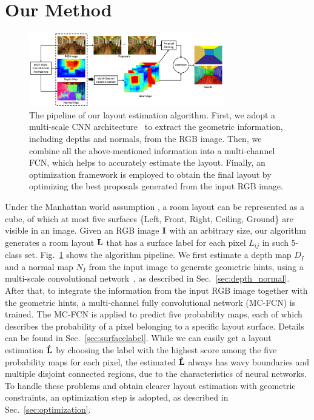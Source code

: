 \section{Our Method}
\label{sec:Meth}

 

\begin{figure}[!ht]
	\centering
	\includegraphics[width=8.5cm]{figure/ppline.png}
	\caption{The pipeline of our layout estimation algorithm. First, we adopt a multi-scale CNN architecture~\cite{eigen2015predicting} to extract the geometric information, including depths and normals, from the RGB image. Then, we combine all the above-mentioned information into a multi-channel FCN, which helps to accurately estimate the layout. Finally, an optimization framework is employed to obtain the final layout by optimizing the best proposals generated from the input RGB image.}
	\label{fig:pipeline}
\end{figure}

Under the Manhattan world assumption \cite{coughlan1999manhattan}, a room layout can be represented as a cube, of which at most five surfaces \{Left, Front, Right, Ceiling, Ground\} are visible in an image. 
%
Given an RGB image $\mathbf{I}$ with an arbitrary size, our algorithm generates a room layout $\mathbf{L}$ that has a surface label for each pixel $L_{ij}$ in such 5-class set. Fig.~\ref{fig:pipeline} shows the algorithm pipeline. 
We first estimate a depth map $D_{I}$ and a normal map $N_{I}$ from the input image to generate geometric hints, using a multi-scale convolutional network~\cite{eigen2015predicting}, as described in Sec.~\ref{sec:depth_normal}.
After that, to integrate the information from the input RGB image together with the geometric hints, a multi-channel fully convolutional network (MC-FCN) is trained. 
The MC-FCN is applied to predict five probability maps, each of which describes the probability of a pixel belonging to a specific layout surface. Details can be found in Sec.~\ref{sec:surfacelabel}.
While we can easily get a layout estimation $\mathbf{\hat{L}}$ by choosing the label with the highest score among the five probability maps for each pixel, the estimated $\mathbf{\hat{L}}$ always has wavy boundaries and multiple disjoint connected regions, due to the characteristics of neural networks. 
To handle these problems and obtain clearer layout estimation with geometric constraints, an optimization step is adopted, as described in Sec.~\ref{sec:optimization}.  
 


